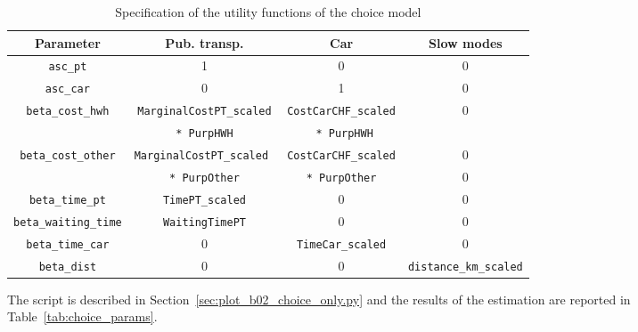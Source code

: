 \documentclass[12pt,a4paper]{article}
\begin{document}
\begin{table}[htb]
  \begin{tabular}{cccc}
Parameter    & Pub. transp. & Car & Slow modes \\
    \hline
    \hline
\lstinline$asc_pt$ &    1 &   0 &  0 \\
    \hline
\lstinline$asc_car$ &   0 &   1 &  0 \\
    \hline
\lstinline$beta_cost_hwh$ & \lstinline$MarginalCostPT_scaled$ & \lstinline$CostCarCHF_scaled$ & 0 \\
 & \lstinline$* PurpHWH$ & \lstinline$ * PurpHWH$ & \\
    \hline
\lstinline$beta_cost_other$  & \lstinline$MarginalCostPT_scaled $ & \lstinline$CostCarCHF_scaled$ & 0 \\
& \lstinline$* PurpOther$ & \lstinline$* PurpOther$& 0 \\
    \hline
\lstinline$beta_time_pt$ & \lstinline$TimePT_scaled$ & 0 & 0 \\
    \hline
\lstinline$beta_waiting_time$ & \lstinline$WaitingTimePT$ & 0 & 0 \\
    \hline
\lstinline$beta_time_car$ & 0 & \lstinline$TimeCar_scaled$ & 0\\
    \hline
\lstinline$beta_dist$ & 0 & 0 & \lstinline$distance_km_scaled$ \\
    \hline
  \end{tabular}
  \caption{\label{tab:spec_choice}Specification of the utility functions of the choice model}
\end{table}

The script is described in Section~\ref{sec:plot_b02_choice_only.py} and the results of the estimation are reported in Table~\vref{tab:choice_params}.
\end{document}
